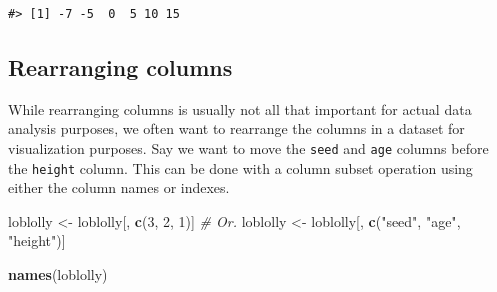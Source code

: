 \documentclass[
  11pt,
]{krantz}
\newenvironment{Shaded}{\begin{snugshade}}{\end{snugshade}}
\newcommand{\CommentTok}[1]{\textcolor[rgb]{0.56,0.35,0.01}{\textit{#1}}}
\newcommand{\DecValTok}[1]{\textcolor[rgb]{0.00,0.00,0.81}{#1}}
\newcommand{\KeywordTok}[1]{\textcolor[rgb]{0.13,0.29,0.53}{\textbf{#1}}}
\newcommand{\NormalTok}[1]{#1}
\newcommand{\OperatorTok}[1]{\textcolor[rgb]{0.81,0.36,0.00}{\textbf{#1}}}
\newcommand{\StringTok}[1]{\textcolor[rgb]{0.31,0.60,0.02}{#1}}
\theoremstyle{definition}
\theoremstyle{definition}
\theoremstyle{definition}
\theoremstyle{definition}
\theoremstyle{remark}
\begin{document}
\begin{Shaded}
\end{Shaded}

\begin{verbatim}
#> [1] -7 -5  0  5 10 15
\end{verbatim}

\begin{Shaded}
\end{Shaded}

\hypertarget{rearranging-columns}{%
\subsection{Rearranging columns}\label{rearranging-columns}}

While rearranging columns is usually not all that important for actual data analysis purposes, we often want to rearrange the columns in a dataset for visualization purposes. Say we want to move the \texttt{seed} and \texttt{age} columns before the \texttt{height} column. This can be done with a column subset operation using either the column names or indexes.

\begin{Shaded}
\begin{Highlighting}[]
\NormalTok{loblolly \textless{}{-}}\StringTok{ }\NormalTok{loblolly[, }\KeywordTok{c}\NormalTok{(}\DecValTok{3}\NormalTok{, }\DecValTok{2}\NormalTok{, }\DecValTok{1}\NormalTok{)]}
\CommentTok{\# Or.}
\NormalTok{loblolly \textless{}{-}}\StringTok{ }\NormalTok{loblolly[, }\KeywordTok{c}\NormalTok{(}\StringTok{"seed"}\NormalTok{, }\StringTok{"age"}\NormalTok{, }\StringTok{"height"}\NormalTok{)]}

\KeywordTok{names}\NormalTok{(loblolly)}
\end{Highlighting}
\end{Shaded}
\end{document}
